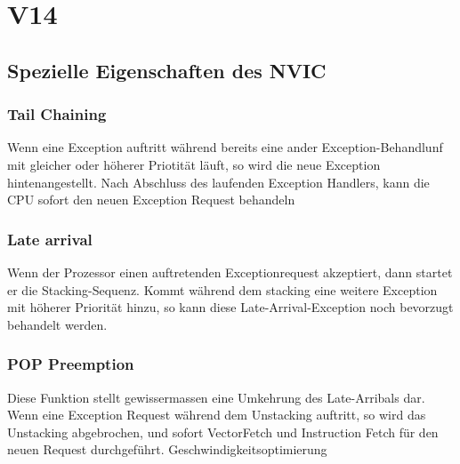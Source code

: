 \section{V14}
\subsection{Spezielle Eigenschaften des NVIC}\label{NVIC}
\subsubsection{Tail Chaining}
Wenn eine Exception auftritt während bereits eine ander Exception-Behandlunf mit gleicher oder höherer Priotität läuft, so wird die neue Exception hintenangestellt. Nach Abschluss des laufenden Exception Handlers, kann die CPU sofort den neuen Exception Request behandeln

\subsubsection{Late arrival}
Wenn der Prozessor einen auftretenden Exceptionrequest akzeptiert, dann startet er die Stacking-Sequenz. Kommt während dem stacking eine weitere Exception mit höherer Priorität hinzu, so kann diese Late-Arrival-Exception noch bevorzugt behandelt werden.

\subsubsection{POP Preemption}
Diese Funktion stellt gewissermassen eine Umkehrung des Late-Arribals dar. Wenn eine Exception Request während dem Unstacking auftritt, so wird das Unstacking abgebrochen, und sofort VectorFetch und Instruction Fetch für den neuen Request durchgeführt. \rightarrow Geschwindigkeitsoptimierung\\

